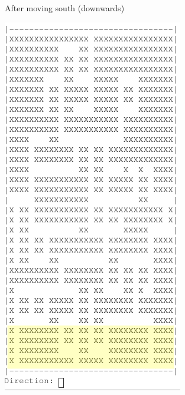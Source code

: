\documentclass{article}
\begin{document}
\begin{multicols*}{3}
                \columnbreak
                After moving south (downwards) \par
                \centerline{\includegraphics[width=0.75\linewidth]{img/Design/Output2.png}}



\end{multicols*}
\end{document}
